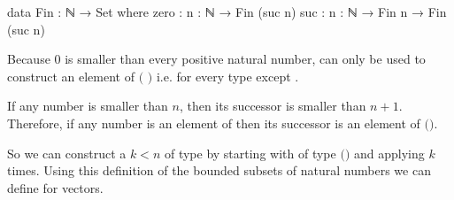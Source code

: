 \documentclass[10pt,a4paper,twoside]{report}
\begin{document}
\begin{code}
data Fin : ℕ → Set where
  zero  : {n : ℕ} → Fin (suc n)
  suc   : {n : ℕ} → Fin n → Fin (suc n)
\end{code}
Because $0$ is smaller than every positive natural number,
 can only be used to construct an element of
\AgdaSpace{}$($
$)$ i.e. for every type except
\AgdaSpace{}.

If any number is smaller than $n$, then its successor is smaller than $n+1$.
Therefore, if any number is an element of
\AgdaSpace{}
then its successor is an element of
\AgdaSpace{}$($\AgdaSpace{}$)$.

So we can construct a $k<n$ of type
\AgdaSpace{} by starting with
 of type
\AgdaSpace{}$($$)$ and applying
 $k$ times.
Using this definition of the bounded subsets of natural numbers we can define
\AgdaFunction{\_!\_} for vectors.
\end{document}
